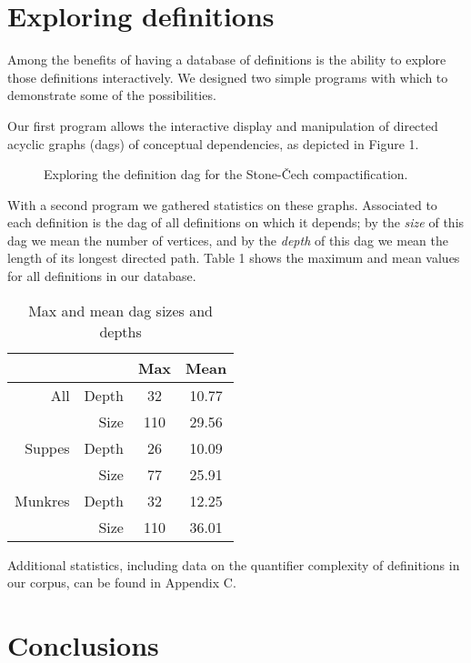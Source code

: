 \documentclass{llncs}
\begin{document}
\section{Exploring definitions}

Among the benefits of having a database of definitions is the ability to explore those definitions interactively. We designed two simple programs with which to demonstrate some of the possibilities.

Our first program allows the interactive display and manipulation of
directed acyclic graphs (dags) of conceptual dependencies, as depicted
in Figure 1.

\begin{figure}
\begin{center}
\label{kmap_screenshot}
\caption[]{Exploring the definition dag for the Stone-\v Cech compactification.}
\end{center}
\end{figure}

With a second program we gathered statistics on these graphs.
Associated to each definition is the dag of all definitions on which
it depends; by the \emph{size} of this dag we mean the number of
vertices, and by the \emph{depth} of this dag we mean the length of
its longest directed path. Table 1 shows the maximum and mean values
for all definitions in our database.

\begin{table}
\label{dag_data}
\begin{center}
\caption{Max and mean dag sizes and depths}
\begin{tabular}{|r|r|c|c|}
\hline
& & Max & Mean \\\hline
All & Depth & 32 & 10.77 \\
  & Size & 110 & 29.56 \\\hline
Suppes & Depth & 26 & 10.09 \\
  & Size & 77 & 25.91 \\\hline
Munkres & Depth & 32 & 12.25 \\
  & Size & 110 & 36.01 \\
\hline
\end{tabular}
\end{center}
\end{table}
Additional statistics, including data on the quantifier complexity of
definitions in our corpus, can be found in Appendix C. 

\section{Conclusions}
\end{document}
